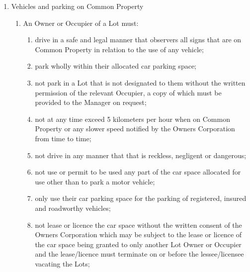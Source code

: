 \documentclass{article}
\begin{document}
\begin{enumerate}[label=\arabic*.]
\begin{enumerate}[label=\arabic{enumi}.\arabic*.]
\begin{enumerate}[label=(\arabic*)]
\begin{enumerate}[label=(\arabic*)]

\item  An Owner or Occupier of a Lot and its invitees must not smoke cigarettes, cigars, e-cigarettes or tobacco on any part of Common Property or otherwise in contravention of any Law.

\item  An Owner or Occupier must ensure they and any of their invitees do not drop cigarette butts onto Common Property or onto another Lot.

\end{enumerate}

\item  Vehicles and parking on Common Property

\begin{enumerate}[label=(\arabic*)]

\item  An Owner or Occupier of a Lot must:

\begin{enumerate}[label=(\alph*)]

\item  drive in a safe and legal manner that observers all signs that are on Common Property in relation to the use of any vehicle;

\item  park wholly within their allocated car parking space;

\item  not park in a Lot that is not designated to them without the written permission of the relevant Occupier, a copy of which must be provided to the Manager on request;

\item  not at any time exceed 5 kilometers per hour when on Common Property or any slower speed notified by the Owners Corporation from time to time;

\item  not drive in any manner that that is reckless, negligent or dangerous;

\item  not use or permit to be used any part of the car space allocated for use other than to park a motor vehicle;

\item  only use their car parking space for the parking of registered, insured and roadworthy vehicles;

\item  not lease or licence the car space without the written consent of the Owners Corporation which may be subject to the lease or licence of the car space being granted to only another Lot Owner or Occupier and the lease/licence must terminate on or before the lessee/licensee vacating the Lots;


\end{enumerate}
\end{enumerate}
\end{enumerate}
\end{enumerate}
\end{enumerate}
\end{document}
